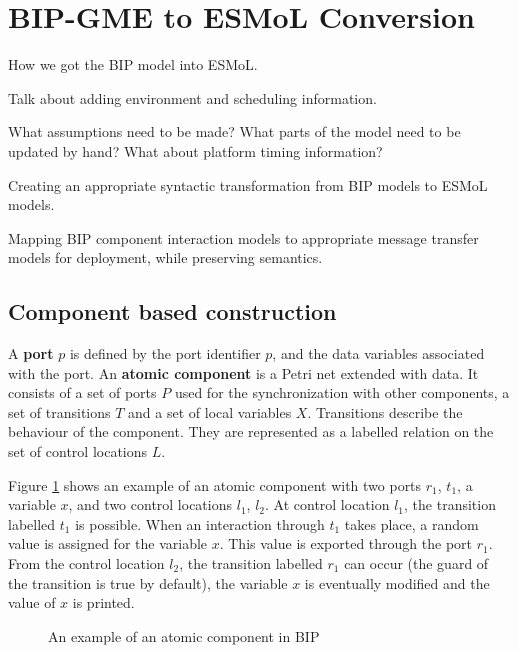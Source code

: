 \section{BIP-GME to ESMoL Conversion}

\label{section:trans}

How we got the BIP model into ESMoL.

Talk about adding environment and scheduling information.

What assumptions need to be made?
What parts of the model need to be updated by hand?
What about platform timing information?

Creating an appropriate syntactic transformation from BIP models to ESMoL models.

Mapping BIP component interaction models to appropriate message transfer models
for deployment, while preserving semantics.

\subsection{Component based construction}
A \textbf{port} $p$ is defined by the port identifier $p$, and the data variables associated with the port. \newline 
An \textbf{atomic component} is a Petri net extended with data. It consists of a set of ports $P$ used for the synchronization with other components, a set of transitions $T$ and a set of local variables $X$. Transitions describe the behaviour of the component. They are represented as a labelled relation on the set of control locations $L$.

Figure \ref{atom} shows an example of an atomic component with two ports $r_1$, $t_1$, a variable $x$, and two control locations $l_1$, $l_2$. At control location $l_1$, the transition labelled $t_1$ is possible. When an interaction through $t_1$ takes place, a random value is assigned for the variable $x$. This value is exported through the port $r_1$. From the control location $l_2$, the transition labelled $r_1$ can occur (the guard of the transition is true by default), the variable $x$ is eventually modified and the value of $x$ is printed.
\begin{figure}[htbp]
  \begin{center}
        
 \end{center}
  \caption{An example of an atomic component in BIP} \label{atom}
\end{figure}


